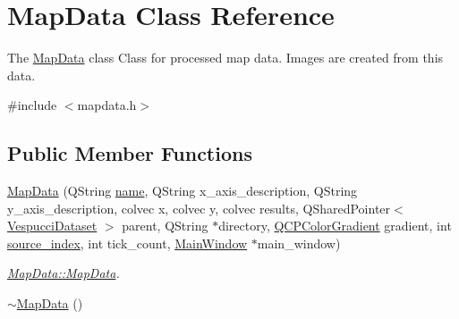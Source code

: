 \hypertarget{class_map_data}{}\section{Map\+Data Class Reference}
\label{class_map_data}


The \hyperlink{class_map_data}{Map\+Data} class Class for processed map data. Images are created from this data.  




{\ttfamily \#include $<$mapdata.\+h$>$}

\subsection*{Public Member Functions}
\begin{DoxyCompactItemize}
\item 
\hyperlink{class_map_data_a725b18060fc42e2625aec4951e2a79a4}{Map\+Data} (Q\+String \hyperlink{class_map_data_af829b775c94e7036c1ad5cd495c942e8}{name}, Q\+String x\+\_\+axis\+\_\+description, Q\+String y\+\_\+axis\+\_\+description, colvec x, colvec y, colvec results, Q\+Shared\+Pointer$<$ \hyperlink{class_vespucci_dataset}{Vespucci\+Dataset} $>$ parent, Q\+String $\ast$directory, \hyperlink{class_q_c_p_color_gradient}{Q\+C\+P\+Color\+Gradient} gradient, int \hyperlink{class_map_data_a24c45edae66512b7a7b7d62be38b91f1}{source\+\_\+index}, int tick\+\_\+count, \hyperlink{class_main_window}{Main\+Window} $\ast$main\+\_\+window)
\begin{DoxyCompactList}\small\item\em \hyperlink{class_map_data_a725b18060fc42e2625aec4951e2a79a4}{Map\+Data\+::\+Map\+Data}. \end{DoxyCompactList}\item 
\hyperlink{class_map_data_afc3e096cf252c30641055ea4eaaab410}{$\sim$\+Map\+Data} ()\hypertarget{class_map_data_afc3e096cf252c30641055ea4eaaab410}{}\label{class_map_data_afc3e096cf252c30641055ea4eaaab410}


\end{DoxyCompactItemize}
